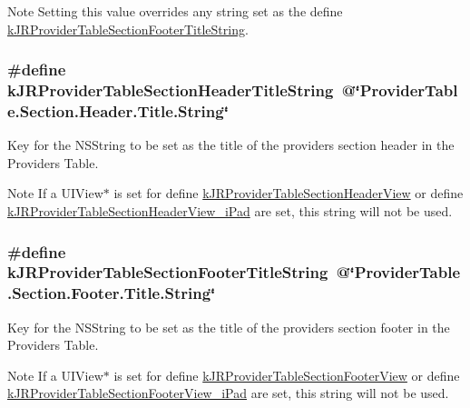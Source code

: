 \begin{DoxyNote}{Note}
Setting this value overrides any string set as the define \hyperlink{group__custom_interface_ga72e63105251e7d4d6a363e279c2bf775}{kJRProviderTableSectionFooterTitleString}. 
\end{DoxyNote}
\hypertarget{group__custom_interface_ga667a6c955993ec24292875f319a7d763}{
\subsubsection[{kJRProviderTableSectionHeaderTitleString}]{\setlength{\rightskip}{0pt plus 5cm}\#define kJRProviderTableSectionHeaderTitleString~@\char`\"{}ProviderTable.Section.Header.Title.String\char`\"{}}}
\label{group__custom_interface_ga667a6c955993ec24292875f319a7d763}
Key for the {\ttfamily NSString} to be set as the title of the providers section header in the Providers Table.

\begin{DoxyNote}{Note}
If a UIView$\ast$ is set for define \hyperlink{group__custom_interface_gaaff8ebdd2b9badb1d0a019a71d47db46}{kJRProviderTableSectionHeaderView} or define \hyperlink{group__custom_interface_ga7dcb3488390fabe1f3a358fb5af1e42c}{kJRProviderTableSectionHeaderView\_\-iPad} are set, this string will not be used. 
\end{DoxyNote}
\hypertarget{group__custom_interface_ga72e63105251e7d4d6a363e279c2bf775}{
\subsubsection[{kJRProviderTableSectionFooterTitleString}]{\setlength{\rightskip}{0pt plus 5cm}\#define kJRProviderTableSectionFooterTitleString~@\char`\"{}ProviderTable.Section.Footer.Title.String\char`\"{}}}
\label{group__custom_interface_ga72e63105251e7d4d6a363e279c2bf775}
Key for the {\ttfamily NSString} to be set as the title of the providers section footer in the Providers Table.

\begin{DoxyNote}{Note}
If a UIView$\ast$ is set for define \hyperlink{group__custom_interface_ga984c096e9258dea402a1c27ae8bb6c8f}{kJRProviderTableSectionFooterView} or define \hyperlink{group__custom_interface_gaa2196cc44d4e0dc4de9e98248c8a7e10}{kJRProviderTableSectionFooterView\_\-iPad} are set, this string will not be used. 
\end{DoxyNote}
